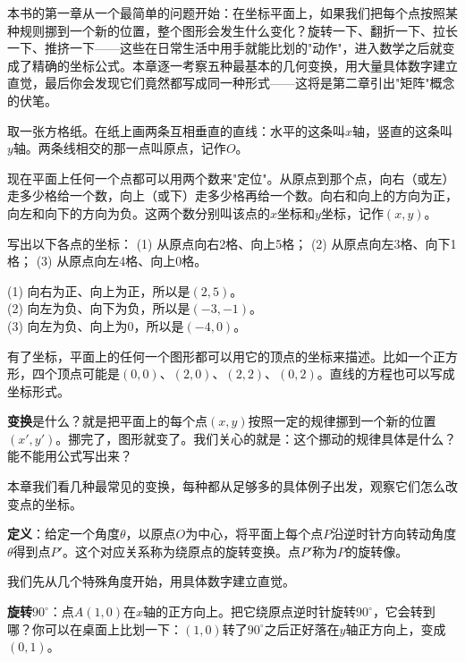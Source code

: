 
本书的第一章从一个最简单的问题开始：在坐标平面上，如果我们把每个点按照某种规则挪到一个新的位置，整个图形会发生什么变化？旋转一下、翻折一下、拉长一下、推挤一下——这些在日常生活中用手就能比划的"动作"，进入数学之后就变成了精确的坐标公式。本章逐一考察五种最基本的几何变换，用大量具体数字建立直觉，最后你会发现它们竟然都写成同一种形式——这将是第二章引出"矩阵"概念的伏笔。


取一张方格纸。在纸上画两条互相垂直的直线：水平的这条叫$x$轴，竖直的这条叫$y$轴。两条线相交的那一点叫原点，记作$O$。

现在平面上任何一个点都可以用两个数来"定位"。从原点到那个点，向右（或左）走多少格给一个数，向上（或下）走多少格再给一个数。向右和向上的方向为正，向左和向下的方向为负。这两个数分别叫该点的$x$坐标和$y$坐标，记作$(x,y)$。

\begin{example}
写出以下各点的坐标：
(1) 从原点向右2格、向上5格；
(2) 从原点向左3格、向下1格；
(3) 从原点向左4格、向上0格。
\end{example}
\begin{solution}
(1) 向右为正、向上为正，所以是$(2,5)$。\\
(2) 向左为负、向下为负，所以是$(-3,-1)$。\\
(3) 向左为负、向上为0，所以是$(-4,0)$。
\end{solution}

有了坐标，平面上的任何一个图形都可以用它的顶点的坐标来描述。比如一个正方形，四个顶点可能是$(0,0)$、$(2,0)$、$(2,2)$、$(0,2)$。直线的方程也可以写成坐标形式。

\textbf{变换}是什么？就是把平面上的每个点$(x,y)$按照一定的规律挪到一个新的位置$(x',y')$。挪完了，图形就变了。我们关心的就是：这个挪动的规律具体是什么？能不能用公式写出来？

本章我们看几种最常见的变换，每种都从足够多的具体例子出发，观察它们怎么改变点的坐标。


\textbf{定义}：给定一个角度$\theta$，以原点$O$为中心，将平面上每个点$P$沿逆时针方向转动角度$\theta$得到点$P'$。这个对应关系称为绕原点的旋转变换。点$P'$称为$P$的旋转像。

我们先从几个特殊角度开始，用具体数字建立直觉。

\textbf{旋转$90^\circ$}：点$A(1,0)$在$x$轴的正方向上。把它绕原点逆时针旋转$90^\circ$，它会转到哪？你可以在桌面上比划一下：$(1,0)$转了$90^\circ$之后正好落在$y$轴正方向上，变成$(0,1)$。

